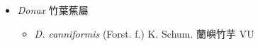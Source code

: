 
  \begin{itemize}
 \item[] \textit{Donax} 竹葉蕉屬
                                
  \begin{itemize}
        \item[] \textit{D. canniformis} (Forst. f.) K. Schum.  蘭嶼竹芋   VU
  \end{itemize}
  \end{itemize}

